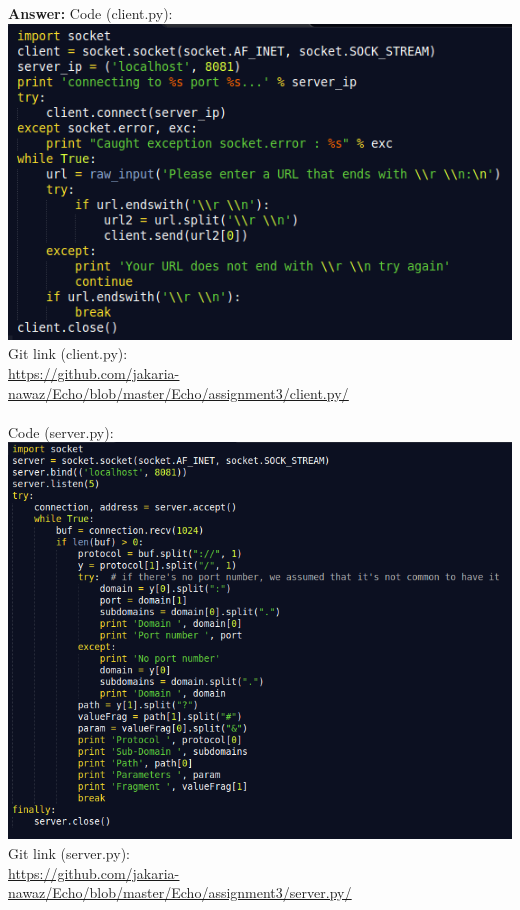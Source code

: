 \documentclass{WeSTassignment}
\begin{document}
\textbf{Answer:} 
Code (client.py): \\ 
\includegraphics[width=1\textwidth]{images/client-image.png} \\
Git link (client.py): \\
{\color{blue}\underline{\href{https://github.com/jakaria-nawaz/Echo/blob/master/Echo/assignment3/client.py/}{https://github.com/jakaria-nawaz/Echo/blob/master/Echo/assignment3/client.py/}}} \\ \\
Code (server.py): \\ 
\includegraphics[width=1\textwidth]{images/server-image.png} \\
Git link (server.py): \\
{\color{blue}\underline{\href{https://github.com/jakaria-nawaz/Echo/blob/master/Echo/assignment3/server.py/}{https://github.com/jakaria-nawaz/Echo/blob/master/Echo/assignment3/server.py/}}} \\ \\
\end{document}
